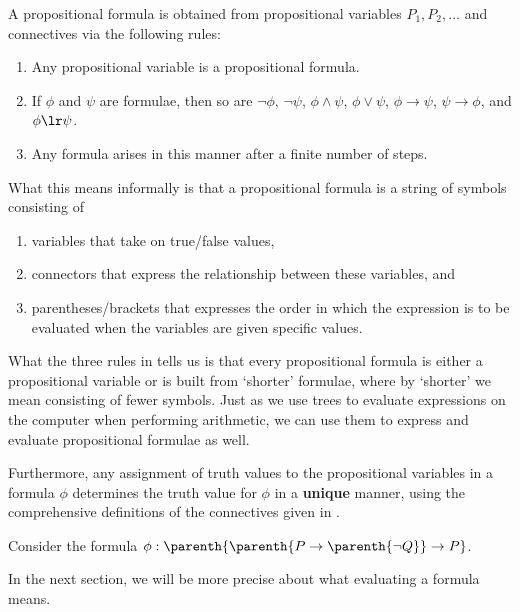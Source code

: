 \begin{boxdefinition}\label{Ch1:Def:PropFormula}
    A propositional formula is obtained from propositional variables $P_1, P_2, \ldots$ and connectives via the following rules:
    \begin{enumerate}[label=\normalfont (\roman*), noitemsep]
        \item Any propositional variable is a propositional formula.
        \item If $\phi$ and $\psi$ are formulae, then so are $\neg \phi$, $\neg \psi$, $\phi \land \psi$, $\phi \lor \psi$, $\phi \to \psi$, $\psi \to \phi$, and $\phi \lr \psi$.
        \item Any formula arises in this manner after a finite number of steps.
    \end{enumerate}
\end{boxdefinition}

What this means informally is that a propositional formula is a string of symbols consisting of
\begin{enumerate}
    \item variables that take on true/false values,
    \item connectors that express the relationship between these variables, and
    \item parentheses/brackets that expresses the order in which the expression is to be evaluated when the variables are given specific values.
\end{enumerate}

What the three rules in  tells us is that every propositional formula is either a propositional variable or is built from `shorter' formulae, where by `shorter' we mean consisting of fewer symbols. Just as we use trees to evaluate expressions on the computer when performing arithmetic, we can use them to express and evaluate propositional formulae as well.

Furthermore, any assignment of truth values to the propositional variables in a formula $\phi$ determines the truth value for $\phi$ in a \textbf{unique} manner, using the comprehensive definitions of the connectives given in .

\begin{boxexample}
    Consider the formula $\phi : \parenth{\parenth{P \to \parenth{\neg Q}} \to P}$. \sorry %
\end{boxexample}

In the next section, we will be more precise about what evaluating a formula means.

